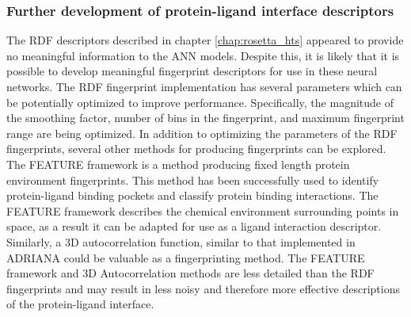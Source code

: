 \subsubsection{Further development of protein-ligand interface descriptors}
The RDF descriptors described in chapter \ref{chap:rosetta_hts} appeared to provide no meaningful information to the ANN models.
Despite this, it is likely that it is possible to develop meaningful fingerprint descriptors for use in these neural networks.
The RDF fingerprint implementation has several parameters which can be potentially optimized to improve performance.
Specifically, the magnitude of the smoothing factor, number of bins in the fingerprint, and maximum fingerprint range are being optimized.
In addition to optimizing the parameters of the RDF fingerprints, several other methods for producing fingerprints can be explored.
The FEATURE framework\citep{Halperin:2008ce} is a method producing fixed length protein environment fingerprints.
This method has been successfully used to identify protein-ligand binding pockets and classify protein binding interactions. 
The FEATURE framework describes the chemical environment surrounding points in space, as a result it can be adapted for use as a ligand interaction descriptor.
Similarly, a 3D autocorrelation function, similar to that implemented in ADRIANA\citep{Code:2011uf} could be valuable as a fingerprinting method.
The FEATURE framework and 3D Autocorrelation methods are less detailed than the RDF fingerprints and may result in less noisy and therefore more effective descriptions of the protein-ligand interface.

